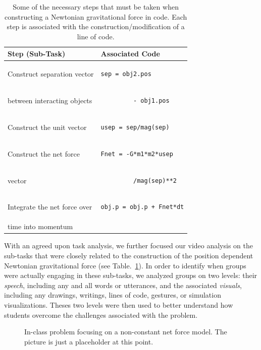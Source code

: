 \documentclass{msuphddissertation}
\begin{document}
\begin{doublespace}
\begin{table}[hb]
\caption{Some of the necessary steps that must be taken when constructing a Newtonian gravitational force in code.  Each step is associated with the construction/modification of a line of code.\label{tab1}}
\begin{tabular}{ll}
\textbf{Step (Sub-Task)} & \textbf{Associated Code} \\\hline
Construct separation vector & \begin{lstlisting}
sep = obj2.pos
\end{lstlisting}\\
between interacting objects & \begin{lstlisting}
         - obj1.pos
\end{lstlisting}\\\hline
Construct the unit vector & \begin{lstlisting}
usep = sep/mag(sep)
\end{lstlisting}\\\hline
Construct the net force & \begin{lstlisting}
Fnet = -G*m1*m2*usep
\end{lstlisting}\\
vector & \begin{lstlisting}
         /mag(sep)**2
\end{lstlisting}\\\hline
Integrate the net force over & \begin{lstlisting}
obj.p = obj.p + Fnet*dt
\end{lstlisting}\\
time into momentum & \\
\end{tabular}
\end{table}

With an agreed upon task analysis, we further focused our video analysis on the sub-tasks that were closely related to the construction of the position dependent Newtonian gravitational force (see Table.~\ref{tab1}).  In order to identify when groups were actually engaging in these sub-tasks, we analyzed groups on two levels: their \textit{speech}, including any and all words or utterances, and the associated \textit{visuals}, including any drawings, writings, lines of code, gestures, or simulation visualizations.  Theses two levels were then used to better understand how students overcome the challenges associated with the problem.

\begin{figure}[ht]\centering
\caption{In-class problem focusing on a non-constant net force model.  The picture is just a placeholder at this point.}
\end{figure}


\end{doublespace}
\end{document}

